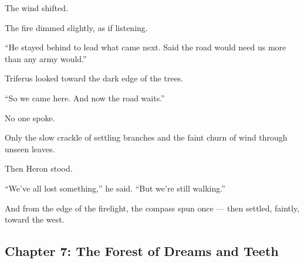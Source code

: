 \documentclass[9pt]{article}
\begin{document}
The wind shifted.

The fire dimmed slightly, as if listening.

“He stayed behind to lead what came next. Said the road would need us more than any army would.”

Triferus looked toward the dark edge of the trees.

“So we came here. And now the road waits.”

\vspace{1em}

No one spoke.

Only the slow crackle of settling branches and the faint churn of wind through unseen leaves.

Then Heron stood.

“We’ve all lost something,” he said. “But we’re still walking.”

\vspace{1em}

And from the edge of the firelight, the compass spun once — then settled, faintly, toward the west.

\newpage

\subsection*{Chapter 7: The Forest of Dreams and Teeth}

\vspace{1in}
\end{document}
